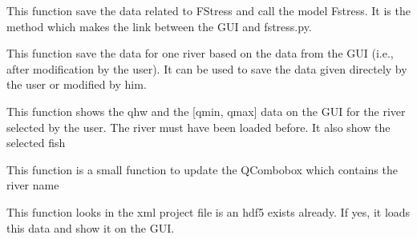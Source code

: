\documentclass[letterpaper,10pt,english]{sphinxmanual}
\begin{document}
\begin{fulllineitems}
\begin{fulllineitems}
\label{\detokenize{index:src_GUI.fstress_GUI.FstressW.runsave_fstress}}
This function save the data related to FStress and call the model Fstress. It is the method which makes the
link between the GUI and fstress.py.

\end{fulllineitems}


\begin{fulllineitems}
\label{\detokenize{index:src_GUI.fstress_GUI.FstressW.save_river_data}}
This function save the data for one river based on the data from the GUI (i.e., after modification by the user).
It can be used to save the data given directely by the user or modified by him.

\end{fulllineitems}


\begin{fulllineitems}
\label{\detokenize{index:src_GUI.fstress_GUI.FstressW.show_data_one_river}}
This function shows the qhw and the {[}qmin, qmax{]} data on the GUI for the river selected by the user.
The river must have been loaded before. It also show the selected fish

\end{fulllineitems}


\begin{fulllineitems}
\label{\detokenize{index:src_GUI.fstress_GUI.FstressW.update_list_riv}}
This function is a small function to update the QCombobox which contains the river name

\end{fulllineitems}


\begin{fulllineitems}
\label{\detokenize{index:src_GUI.fstress_GUI.FstressW.was_loaded_before}}
This function looks in the xml project file is an hdf5 exists already. If yes, it loads this data
and show it on the GUI.

\end{fulllineitems}


\end{fulllineitems}
\end{document}
